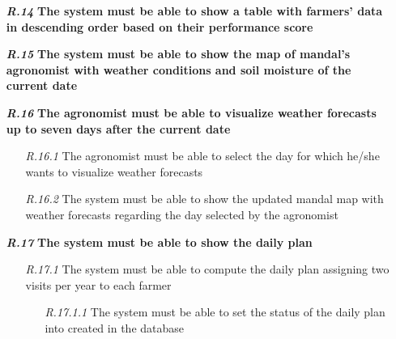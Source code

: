 \begin{itemize}
\item [\textbf{\textit{R.14}}] \textbf{The system must be able to show a table with farmers' data in descending order based on their performance score}
\item [\textbf{\textit{R.15}}] \textbf{The system must be able to show the map of mandal's agronomist with weather conditions and soil moisture of the current date}
\item [\textbf{\textit{R.16}}] \textbf{The agronomist must be able to visualize weather forecasts up to seven days after the current date}
        \begin{itemize}
            \item [\textit{R.16.1}] The agronomist must be able to select the day for which he/she wants to visualize weather forecasts
	        \item [\textit{R.16.2}] The system must be able to show the updated mandal map with weather forecasts regarding the day selected by the agronomist
        \end{itemize}
        \item [\textbf{\textit{R.17}}] \textbf{The system must be able to show the daily plan}
        \begin{itemize}
            \item [\textit{R.17.1}] The system must be able to compute the daily plan assigning two visits per year to each farmer
            \begin{itemize}
                \item [\textit{R.17.1.1}] The system must be able to set the status of the daily plan into created in the database
            \end{itemize}
        \end{itemize}
		


\end{itemize}
